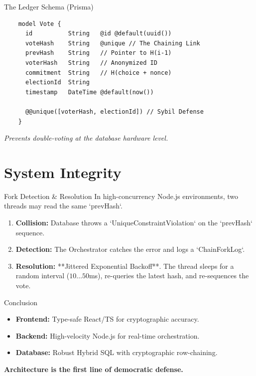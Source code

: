 \documentclass[10pt]{beamer}
\begin{document}
\begin{frame}{The Ledger Schema (Prisma)}
    \begin{lstlisting}
    model Vote {
      id          String   @id @default(uuid())
      voteHash    String   @unique // The Chaining Link
      prevHash    String   // Pointer to H(i-1)
      voterHash   String   // Anonymized ID
      commitment  String   // H(choice + nonce)
      electionId  String
      timestamp   DateTime @default(now())
      
      @@unique([voterHash, electionId]) // Sybil Defense
    }
    \end{lstlisting}
    \textit{Prevents double-voting at the database hardware level.}
\end{frame}

\section{System Integrity}

\begin{frame}{Fork Detection \& Resolution}
    In high-concurrency Node.js environments, two threads may read the same `prevHash`.
    \begin{enumerate}
        \item \textbf{Collision:} Database throws a `UniqueConstraintViolation` on the `prevHash` sequence.
        \item \textbf{Detection:} The Orchestrator catches the error and logs a `ChainForkLog`.
        \item \textbf{Resolution:} **Jittered Exponential Backoff**. The thread sleeps for a random interval ($10\dots50$ms), re-queries the latest hash, and re-sequences the vote.
    \end{enumerate}
\end{frame}

\begin{frame}{Conclusion}
    \begin{itemize}
        \item \textbf{Frontend:} Type-safe React/TS for cryptographic accuracy.
        \item \textbf{Backend:} High-velocity Node.js for real-time orchestration.
        \item \textbf{Database:} Robust Hybrid SQL with cryptographic row-chaining.
    \end{itemize}
    \vspace{0.5cm}
    \centering
    \textbf{Architecture is the first line of democratic defense.}
\end{frame}
\end{document}

